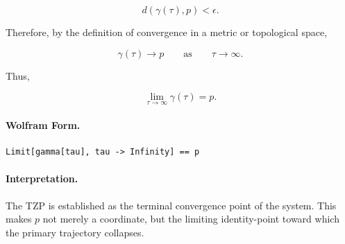 \begin{minipage}[t]{0.49\linewidth}
\begin{minipage}[t]{0.49\linewidth}
\begin{minipage}[t]{0.49\linewidth}
\begin{minipage}[t]{0.49\linewidth}
\begin{minipage}[t]{0.49\linewidth}
\begin{minipage}[t]{0.49\linewidth}
\begin{minipage}[t]{0.49\linewidth}
\begin{minipage}[t]{0.49\linewidth}
\begin{minipage}[t]{0.49\linewidth}
\begin{minipage}[t]{0.49\linewidth}
\begin{minipage}[t]{0.49\linewidth}
\begin{minipage}[t]{0.49\linewidth}
\begin{minipage}[t]{0.49\linewidth}
\begin{minipage}[t]{0.49\linewidth}
\begin{minipage}[t]{0.49\linewidth}
\begin{minipage}[t]{0.49\linewidth}
\begin{minipage}[t]{0.49\linewidth}
\begin{minipage}[t]{0.49\linewidth}
\begin{minipage}[t]{0.49\linewidth}
\begin{minipage}[t]{0.49\linewidth}
\begin{minipage}[t]{0.49\linewidth}
\begin{minipage}[t]{0.49\linewidth}
\begin{minipage}[t]{0.49\linewidth}
\begin{minipage}[t]{0.49\linewidth}
\begin{minipage}[t]{0.49\linewidth}
\begin{minipage}[t]{0.49\linewidth}
\begin{minipage}[t]{0.49\linewidth}
\begin{minipage}[t]{0.49\linewidth}
\begin{minipage}[t]{0.49\linewidth}
\begin{minipage}[t]{0.49\linewidth}
\begin{minipage}[t]{0.49\linewidth}
\begin{minipage}[t]{0.49\linewidth}
\begin{equation}
d(\gamma(\tau),p)<\epsilon .
\end{equation}

Therefore, by the definition of convergence in a metric or topological space,

\begin{equation}
\gamma(\tau)\longrightarrow p
\qquad\text{as}\qquad
\tau\to\infty .
\end{equation}

Thus,

\begin{equation}
\boxed{\lim_{\tau\to\infty}\gamma(\tau)=p .}
\end{equation}

\paragraph{Wolfram Form.}
\begin{verbatim}
Limit[gamma[tau], tau -> Infinity] == p
\end{verbatim}

\paragraph{Interpretation.}
The TZP is established as the terminal convergence point of the system. This makes $p$ not merely a coordinate, but the limiting identity-point toward which the primary trajectory collapses.


\end{minipage}
\end{minipage}
\end{minipage}
\end{minipage}
\end{minipage}
\end{minipage}
\end{minipage}
\end{minipage}
\end{minipage}
\end{minipage}
\end{minipage}
\end{minipage}
\end{minipage}
\end{minipage}
\end{minipage}
\end{minipage}
\end{minipage}
\end{minipage}
\end{minipage}
\end{minipage}
\end{minipage}
\end{minipage}
\end{minipage}
\end{minipage}
\end{minipage}
\end{minipage}
\end{minipage}
\end{minipage}
\end{minipage}
\end{minipage}
\end{minipage}
\end{minipage}
